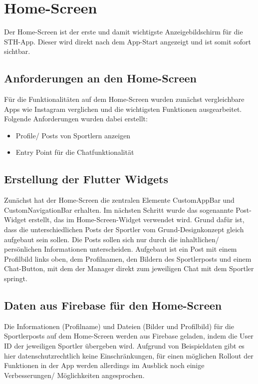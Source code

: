 \section{Home-Screen}
Der Home-Screen ist der erste und damit wichtigste Anzeigebildschirm für die STH-App. 
Dieser wird direkt nach dem App-Start angezeigt und ist somit sofort sichtbar.
\subsection{Anforderungen an den Home-Screen}
Für die Funktionalitäten auf dem Home-Screen wurden zunächst vergleichbare Apps wie Instagram verglichen und die wichtigsten Funktionen ausgearbeitet.\newline
Folgende Anforderungen wurden dabei erstellt:
\begin{itemize}
    \item Profile/ Posts von Sportlern anzeigen
    \item Entry Point für die Chatfunktionalität
\end{itemize}

\subsection{Erstellung der Flutter Widgets}
Zunächst hat der Home-Screen die zentralen Elemente CustomAppBar und CustomNavigationBar erhalten.
Im nächsten Schritt wurde das sogenannte Post-Widget erstellt, das im Home-Screen-Widget verwendet wird.
Grund dafür ist, dass die unterschiedlichen Posts der Sportler vom Grund-Designkonzept gleich aufgebaut sein sollen. 
Die Posts sollen sich nur durch die inhaltlichen/ persönlichen Informationen unterscheiden.\newline
Aufgebaut ist ein Post mit einem Profilbild links oben, dem Profilnamen, den Bildern des Sportlerposts und einem Chat-Button, mit dem der Manager direkt zum jeweiligen Chat mit dem Sportler springt.

\subsection{Daten aus Firebase für den Home-Screen}
Die Informationen (Profilname) und Dateien (Bilder und Profilbild) für die Sportlerposts auf dem Home-Screen werden aus Firebase geladen, indem die User ID der jeweiligen Sportler übergeben wird.
Aufgrund von Beispieldaten gibt es hier datenschutzrechtlich keine Einschränkungen, für einen möglichen Rollout der Funktionen in der App werden allerdings im Ausblick noch einige Verbesserungen/ Möglichkeiten angesprochen.

